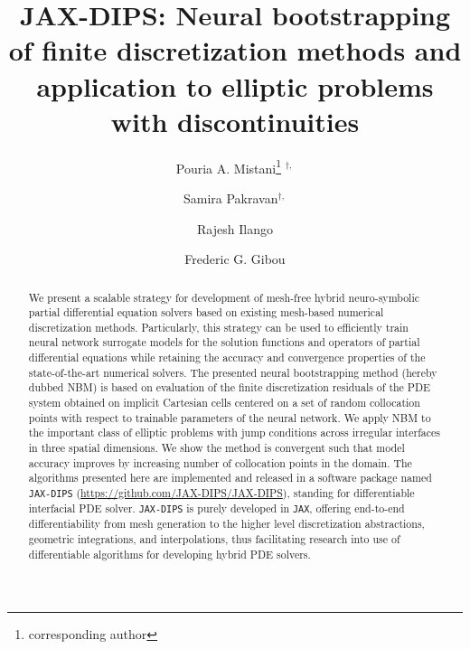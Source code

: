 \documentclass{elsarticle}
\begin{document}

\title{JAX-DIPS: Neural bootstrapping of finite discretization methods and application to elliptic problems with discontinuities}




\author[1]{Pouria A. Mistani\thanks{corresponding author} $^{\dagger,}$}
\author[2]{Samira Pakravan$^{\dagger,}$}
\author[1]{Rajesh Ilango}
\author[2]{Frederic G. Gibou}

\address[1]{NVIDIA Corporation, Santa Clara, CA 95051, USA}
\address[2]{University of California, Santa Barbara, CA 93106-5070, USA}

\begin{abstract}
	We present a scalable strategy for development of mesh-free hybrid neuro-symbolic partial differential equation solvers based on existing mesh-based numerical discretization methods. Particularly, this strategy can be used to efficiently train neural network surrogate models for the solution functions and operators of partial differential equations while retaining the accuracy and convergence properties of the state-of-the-art numerical solvers. The presented neural bootstrapping method (hereby dubbed NBM) is based on evaluation of the finite discretization residuals of the PDE system obtained on implicit Cartesian cells centered on a set of random collocation points with respect to trainable parameters of the neural network. We apply NBM to the important class of elliptic problems with jump conditions across irregular interfaces in three spatial dimensions. We show the method is convergent such that model accuracy improves by increasing number of collocation points in the domain.  The algorithms presented here are implemented and released in a software package named \texttt{JAX-DIPS} (\href{https://github.com/JAX-DIPS/JAX-DIPS}{https://github.com/JAX-DIPS/JAX-DIPS}), standing for differentiable interfacial PDE solver. \texttt{JAX-DIPS} is purely developed in \texttt{JAX}, offering end-to-end differentiability from mesh generation to the higher level discretization abstractions, geometric integrations, and interpolations, thus facilitating research into use of differentiable algorithms for developing hybrid PDE solvers.

\end{abstract}
\end{document}
